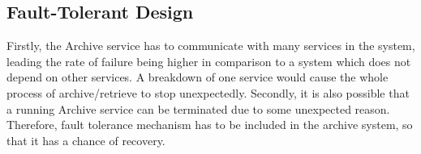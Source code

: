         \subsection{Fault-Tolerant Design}   
        Firstly, the Archive service has to communicate with many services in the system, leading the rate of failure being higher
        in comparison to a system which does not depend on other services. A breakdown 
        of one service would cause the whole process of archive/retrieve to stop unexpectedly. Secondly, it is also possible that a running Archive service can be terminated
        due to some unexpected reason. Therefore, fault tolerance mechanism has to be included in the archive system, so that it has a chance of 
        recovery. 
